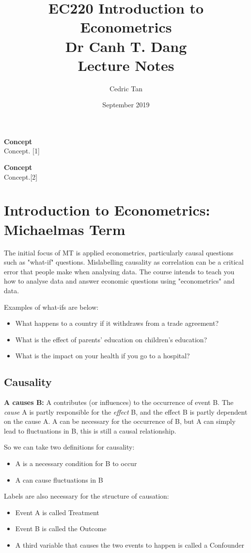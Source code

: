 \documentclass[12pt, letterpaper]{article}
\title{
	{EC220 Introduction to Econometrics}\\
	{\large{Dr Canh T. Dang}}\\
	{\large{Lecture Notes}}
}
\author{Cedric Tan}
\date{September 2019}
\begin{document}
\maketitle
{\small
  \noindent\textbf{Concept}\\
  Concept. \hspace*{\fill}[1]

  \vspace{10pt}
  \noindent\textbf{Concept}\\
  Concept.\hspace*{\fill}[2]

\newpage
\tableofcontents
\newpage
\section{Introduction to Econometrics: Michaelmas Term}
The initial focus of MT is applied econometrics, particularly causal questions such as "what-if" questions. Mislabelling causality as correlation can be a critical error that people make when analysing data. The course intends to teach you how to analyse data and answer economic questions using "econometrics" and data.

\vspace{10pt}
\noindent Examples of what-ifs are below:
\begin{itemize}
	\item What happens to a country if it withdraws from a trade agreement?
	\item What is the effect of parents' education on children's education?
	\item What is the impact on your health if you go to a hospital?
\end{itemize}

\subsection{Causality}
\textbf{A causes B:} A contributes (or influences) to the occurrence of event B. The \textit{cause} A is partly responsible for the \textit{effect}
 B, and the effect B is partly dependent on the cause A. A can be necessary for the occurrence of B, but A can simply lead to fluctuations in B, this is still a causal relationship.
 
\vspace{10pt}
\noindent So we can take two definitions for causality:
\begin{itemize}
	\item A is a necessary condition for B to occur
	\item A can cause fluctuations in B
\end{itemize}
Labels are also necessary for the structure of causation:
\begin{itemize}
	\item Event A is called Treatment
	\item Event B is called the Outcome
	\item A third variable that causes the two events to happen is called a Confounder
\end{itemize}

}
\end{document}

